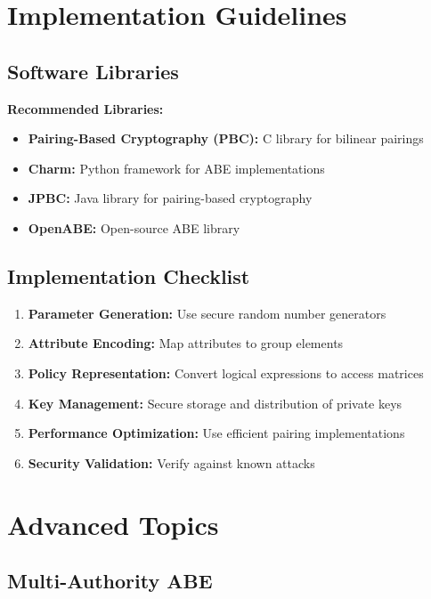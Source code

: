 \documentclass[11pt,a4paper]{article}
\begin{document}
\section{Implementation Guidelines}

\subsection{Software Libraries}

\begin{examplebox}
\textbf{Recommended Libraries:}
\begin{itemize}
    \item \textbf{Pairing-Based Cryptography (PBC):} C library for bilinear pairings
    \item \textbf{Charm:} Python framework for ABE implementations
    \item \textbf{JPBC:} Java library for pairing-based cryptography
    \item \textbf{OpenABE:} Open-source ABE library
\end{itemize}
\end{examplebox}

\subsection{Implementation Checklist}

\begin{enumerate}
    \item \textbf{Parameter Generation:} Use secure random number generators
    \item \textbf{Attribute Encoding:} Map attributes to group elements
    \item \textbf{Policy Representation:} Convert logical expressions to access matrices
    \item \textbf{Key Management:} Secure storage and distribution of private keys
    \item \textbf{Performance Optimization:} Use efficient pairing implementations
    \item \textbf{Security Validation:} Verify against known attacks
\end{enumerate}

\section{Advanced Topics}

\subsection{Multi-Authority ABE}
\end{document}
